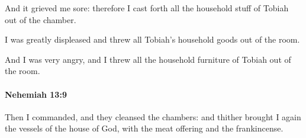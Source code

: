 			\begin{versebox}
					\item[BHS] 
					\item[LXX] 
					\item[ASV] And it grieved me sore: therefore I cast forth all the household stuff of Tobiah out of the chamber.
					\item[NIV] I was greatly displeased and threw all Tobiah’s household goods out of the room.
					\item[NRSV] And I was very angry, and I threw all the household furniture of Tobiah out of the room.
			\end{versebox}

		\paragraph{Nehemiah 13:9} %
			\label{NEHEMIAH-13-9}

			Then I commanded, and they cleansed the chambers: and thither brought I again the vessels of the house of God, with the meat offering and the frankincense.

